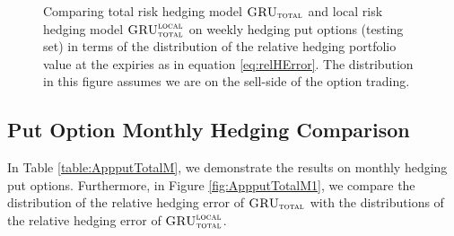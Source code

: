 \documentclass[letterpaper,12pt,titlepage,oneside,final]{book}
\numberwithin{equation}{section}
\theoremstyle{definition}
\newcommand{\modelT}{\textsc{GRU}_{\textsc{total}}}
\newcommand{\modelL}{\textsc{GRU}_{\textsc{total}}^{\textsc{local}}}
\begin{document}
\begin{figure}[htp!]
	\centering
	
	\caption{Comparing total risk hedging model $\modelT$ and local risk hedging model $\modelL$ on weekly hedging put options (testing set) in terms of the distribution of the  relative hedging portfolio value at the expiries as in equation \eqref{eq:relHError}. The distribution in this figure assumes we are on the sell-side of the option trading.} \label{fig:AppputTotalW1}
\end{figure}

\newpage
\subsection{Put Option Monthly Hedging Comparison}
In Table \ref{table:AppputTotalM}, we demonstrate the results on monthly hedging put options. Furthermore, in Figure \ref{fig:AppputTotalM1}, we compare the distribution of the relative hedging error of $\modelT$ with the distributions of the relative hedging error of $\modelL$.
\end{document}
